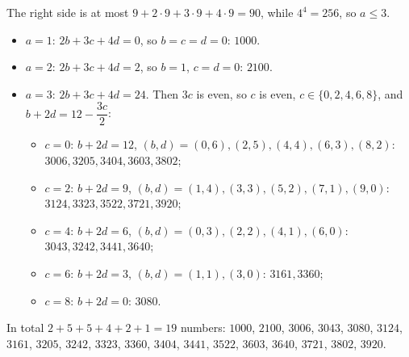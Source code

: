 The right side is at most $9+2\cdot9+3\cdot9+4\cdot9=90$, while $4^4=256$, so $a\le3$.
\begin{itemize}
\item $a=1$: $2b+3c+4d=0$, so $b=c=d=0$: $1000$.
\item $a=2$: $2b+3c+4d=2$, so $b=1$, $c=d=0$: $2100$.
\item $a=3$: $2b+3c+4d=24$. Then $3c$ is even, so $c$ is even, $c\in\{0,2,4,6,8\}$, and $b+2d=12-\dfrac{3c}{2}$:
\begin{itemize}
\item $c=0$: $b+2d=12$, $(b,d)=(0,6),(2,5),(4,4),(6,3),(8,2)$: $3006,3205,3404,3603,3802$;
\item $c=2$: $b+2d=9$, $(b,d)=(1,4),(3,3),(5,2),(7,1),(9,0)$: $3124,3323,3522,3721,3920$;
\item $c=4$: $b+2d=6$, $(b,d)=(0,3),(2,2),(4,1),(6,0)$: $3043,3242,3441,3640$;
\item $c=6$: $b+2d=3$, $(b,d)=(1,1),(3,0)$: $3161,3360$;
\item $c=8$: $b+2d=0$: $3080$.
\end{itemize}
\end{itemize}
In total $2+5+5+4+2+1=\boxed{19}$ numbers: $1000$, $2100$, $3006$, $3043$, $3080$, $3124$, $3161$, $3205$, $3242$, $3323$, $3360$, $3404$, $3441$, $3522$, $3603$, $3640$, $3721$, $3802$, $3920$.
